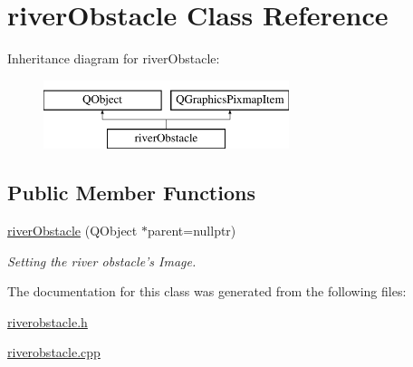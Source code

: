 \hypertarget{classriverObstacle}{\section{river\-Obstacle Class Reference}
\label{classriverObstacle}
}
Inheritance diagram for river\-Obstacle\-:\begin{figure}[H]
\begin{center}
\leavevmode
\includegraphics[height=2.000000cm]{classriverObstacle}
\end{center}
\end{figure}
\subsection*{Public Member Functions}
\begin{DoxyCompactItemize}
\item 
\hypertarget{classriverObstacle_ae2f932cd576cd8297809d0ed8d494867}{\hyperlink{classriverObstacle_ae2f932cd576cd8297809d0ed8d494867}{river\-Obstacle} (Q\-Object $\ast$parent=nullptr)}\label{classriverObstacle_ae2f932cd576cd8297809d0ed8d494867}

\begin{DoxyCompactList}\small\item\em Setting the river obstacle's Image. \end{DoxyCompactList}\end{DoxyCompactItemize}


The documentation for this class was generated from the following files\-:\begin{DoxyCompactItemize}
\item 
\hyperlink{riverobstacle_8h}{riverobstacle.\-h}\item 
\hyperlink{riverobstacle_8cpp}{riverobstacle.\-cpp}\end{DoxyCompactItemize}
